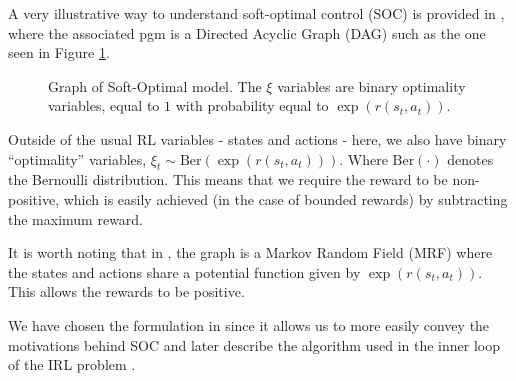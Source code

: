 \documentclass{report}
\numberwithin{equation}{section}
\numberwithin{figure}{section}
\numberwithin{table}{section}
\numberwithin{algorithm}{section}
\begin{document}
A very illustrative way to understand soft-optimal control (SOC) 
is provided in \cite{LevineRLasInf}, where the associated 
pgm is a Directed Acyclic Graph (DAG) such as the one 
seen in Figure \ref{fig:SOCGraph}.

\begin{figure}[H]
  \centering
  \caption{\label{fig:SOCGraph} Graph of Soft-Optimal model. 
  The $\xi$ variables are binary optimality variables, equal to 
  $1$ with probability equal to $\exp(r(s_t, a_t))$.}
\end{figure}

Outside of the usual RL variables - states and actions - here, 
we also have binary ``optimality'' variables, $\xi_t\sim \text{Ber}(\exp(r(s_t, a_t)))$.
Where $\text{Ber}(\cdot)$ denotes the Bernoulli distribution. 
This means that we require the reward to be non-positive, which 
is easily achieved (in the case of bounded rewards) by subtracting 
the maximum reward.

It is worth noting that 
in \cite{Ziebart2008}, the graph is a Markov Random Field (MRF) 
where the states and actions share a potential function given 
by $\exp(r(s_t, a_t))$. This allows
the rewards to be positive.

We have chosen the formulation in \cite{LevineRLasInf} 
since it allows us to more 
easily convey the motivations behind SOC and later describe the 
algorithm used in the inner loop of the IRL problem \citep{SAC2}.
\end{document}
